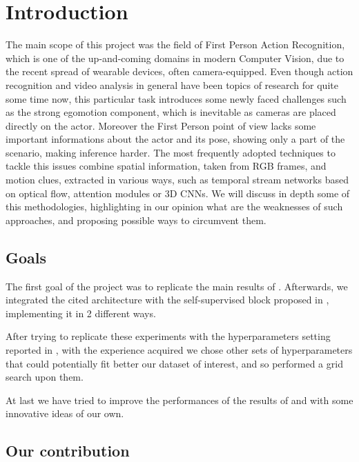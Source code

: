 \documentclass[10pt,twocolumn,hidelinks,letterpaper]{article}
\begin{document}
\section{Introduction}
The main scope of this project was the field of First Person Action Recognition, which is one of the up-and-coming domains in modern Computer Vision, due to the recent spread of wearable devices, often camera-equipped.
Even though action recognition and video analysis in general have been topics of research for quite some time now, this particular task introduces some newly faced challenges such as the strong egomotion component, which is inevitable as cameras are placed directly on the actor. Moreover the First Person point of view lacks some important informations about the actor and its pose, showing only a part of the scenario, making inference harder. The most frequently adopted techniques to tackle this issues combine spatial information, taken from RGB frames, and motion clues, extracted in various ways, such as temporal stream networks based on optical flow, attention modules or 3D CNNs. We will discuss in depth some of this methodologies, highlighting in our opinion what are the weaknesses of such approaches, and proposing possible ways to circumvent them. 

\subsection{Goals}
The first goal of the project was to replicate the main results of \cite{egornn}. Afterwards, we integrated the cited architecture with the self-supervised block proposed in \cite{sparnet}, implementing it in 2 different ways. 

After trying to replicate these experiments with the hyperparameters setting reported in \cite{egornn}, with the experience acquired we chose other sets of hyperparameters that could potentially fit better our dataset of interest, and so performed a grid search upon them.

At last we have tried to improve the performances of the results of \cite{egornn} and \cite{sparnet} with some innovative ideas of our own.


\subsection{Our contribution}
\end{document}
